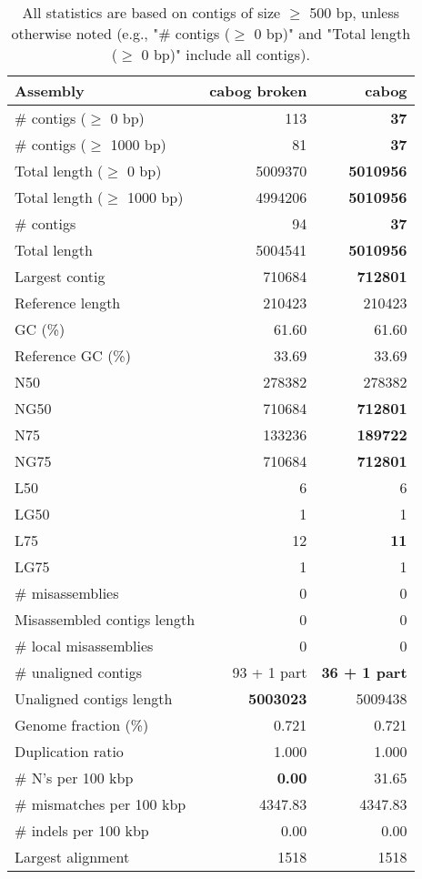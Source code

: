 \documentclass[12pt,a4paper]{article}
\begin{document}
\begin{table}[ht]
\begin{center}
\caption{All statistics are based on contigs of size $\geq$ 500 bp, unless otherwise noted (e.g., "\# contigs ($\geq$ 0 bp)" and "Total length ($\geq$ 0 bp)" include all contigs).}
\begin{tabular}{|l*{2}{|r}|}
\hline
Assembly & cabog broken & cabog \\ \hline
\# contigs ($\geq$ 0 bp) & 113 & {\bf 37} \\ \hline
\# contigs ($\geq$ 1000 bp) & 81 & {\bf 37} \\ \hline
Total length ($\geq$ 0 bp) & 5009370 & {\bf 5010956} \\ \hline
Total length ($\geq$ 1000 bp) & 4994206 & {\bf 5010956} \\ \hline
\# contigs & 94 & {\bf 37} \\ \hline
Total length & 5004541 & {\bf 5010956} \\ \hline
Largest contig & 710684 & {\bf 712801} \\ \hline
Reference length & 210423 & 210423 \\ \hline
GC (\%) & 61.60 & 61.60 \\ \hline
Reference GC (\%) & 33.69 & 33.69 \\ \hline
N50 & 278382 & 278382 \\ \hline
NG50 & 710684 & {\bf 712801} \\ \hline
N75 & 133236 & {\bf 189722} \\ \hline
NG75 & 710684 & {\bf 712801} \\ \hline
L50 & 6 & 6 \\ \hline
LG50 & 1 & 1 \\ \hline
L75 & 12 & {\bf 11} \\ \hline
LG75 & 1 & 1 \\ \hline
\# misassemblies & 0 & 0 \\ \hline
Misassembled contigs length & 0 & 0 \\ \hline
\# local misassemblies & 0 & 0 \\ \hline
\# unaligned contigs & 93 + 1 part & {\bf 36 + 1 part} \\ \hline
Unaligned contigs length & {\bf 5003023} & 5009438 \\ \hline
Genome fraction (\%) & 0.721 & 0.721 \\ \hline
Duplication ratio & 1.000 & 1.000 \\ \hline
\# N's per 100 kbp & {\bf 0.00} & 31.65 \\ \hline
\# mismatches per 100 kbp & 4347.83 & 4347.83 \\ \hline
\# indels per 100 kbp & 0.00 & 0.00 \\ \hline
Largest alignment & 1518 & 1518 \\ \hline
\end{tabular}
\end{center}
\end{table}
\end{document}
